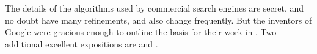 \medskip
The details of the algorithms used by commercial search engines are 
secret, and no doubt have many refinements, and also change frequently.
But the inventors of Google were gracious enough to outline the basis for 
their work in \cite{BrinPage}.
Two additional excellent expositions are 
\cite{Wills} and
\cite{Austin}.

\endinput


